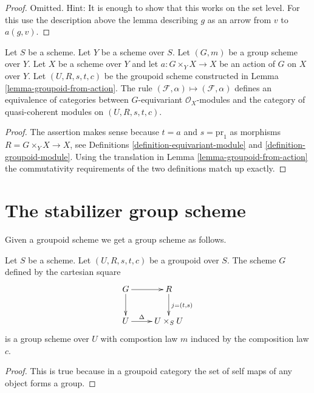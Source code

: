 \begin{proof}
Omitted. Hint: It is enough to show that this works on the set
level. For this use the description above the lemma describing
$g$ as an arrow from $v$ to $a(g, v)$.
\end{proof}

\begin{lemma}
\label{lemma-action-groupoid-modules}
Let $S$ be a scheme.
Let $Y$ be a scheme over $S$.
Let $(G, m)$ be a group scheme over $Y$.
Let $X$ be a scheme over $Y$ and let $a : G \times_Y X \to X$
be an action of $G$ on $X$ over $Y$. Let $(U, R, s, t, c)$ be
the groupoid scheme constructed in Lemma \ref{lemma-groupoid-from-action}.
The rule
$(\mathcal{F}, \alpha) \mapsto (\mathcal{F}, \alpha)$ defines
an equivalence of categories between $G$-equivariant
$\mathcal{O}_X$-modules and the category of quasi-coherent
modules on $(U, R, s, t, c)$.
\end{lemma}

\begin{proof}
The assertion makes sense because $t = a$ and $s = \text{pr}_1$
as morphisms $R = G \times_Y X \to X$, see
Definitions \ref{definition-equivariant-module} and
\ref{definition-groupoid-module}.
Using the translation in Lemma \ref{lemma-groupoid-from-action}
the commutativity requirements
of the two definitions match up exactly.
\end{proof}





\section{The stabilizer group scheme}
\label{section-stabilizer}

\noindent
Given a groupoid scheme we get a group scheme as follows.

\begin{lemma}
\label{lemma-groupoid-stabilizer}
Let $S$ be a scheme.
Let $(U, R, s, t, c)$ be a groupoid over $S$.
The scheme $G$ defined by the cartesian square
$$
\xymatrix{
G \ar[r] \ar[d] & R \ar[d]^{j = (t, s)} \\
U \ar[r]^-{\Delta} & U \times_S U
}
$$
is a group scheme over $U$ with compostion law
$m$ induced by the composition law $c$.
\end{lemma}

\begin{proof}
This is true because in a groupoid category the
set of self maps of any object forms a group.
\end{proof}

